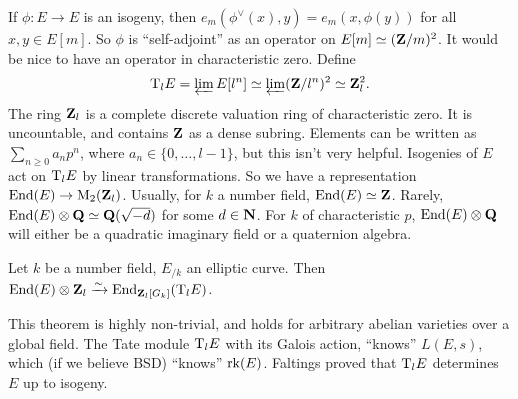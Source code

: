 If $\phi:E\to E$ is an isogeny, then $e_m(\phi^\vee(x),y) = e_m(x,\phi(y))$ for 
all $x,y\in E[m]$. So $\phi$ is ``self-adjoint'' as an operator on 
$E[m]\simeq (\mathbf{Z}/m)^2$. It would be nice to have an operator in characteristic 
zero. Define 
\[
  \mathrm{T}_l E = \varprojlim E[l^n] \simeq \varprojlim (\mathbf{Z}/l^n)^2 \simeq \mathbf{Z}_l^2 .
\]
The ring $\mathbf{Z}_l$ is a complete discrete valuation ring of characteristic zero. 
It is uncountable, and contains $\mathbf{Z}$ as a dense subring. Elements can be 
written as $\sum_{n\geqslant 0} a_n p^n$, where $a_n\in \{0,\dots,l-1\}$, but 
this isn't very helpful. Isogenies of $E$ act on $\mathrm{T}_l E$ by linear 
transformations. So we have a representation $\operatorname{End}(E)\to \operatorname{M}_2(\mathbf{Z}_l)$. 
Usually, for $k$ a number field, $\operatorname{End}(E)\simeq \mathbf{Z}$. Rarely, 
$\operatorname{End}(E)\otimes\mathbf{Q}\simeq \mathbf{Q}(\sqrt{-d})$ for some $d\in \mathbf{N}$. For $k$ of 
characteristic $p$, $\operatorname{End}(E)\otimes \mathbf{Q}$ will either be a quadratic imaginary 
field or a quaternion algebra. 

\begin{theorem}[Faltings]
Let $k$ be a number field, $E_{/k}$ an elliptic curve. Then 
$\operatorname{End}(E)\otimes \mathbf{Z}_l\xrightarrow\sim \operatorname{End}_{\mathbf{Z}_l[G_k]}(\mathrm{T}_l E)$. 
\end{theorem}

This theorem is highly non-trivial, and holds for arbitrary abelian varieties 
over a global field. The Tate module $\mathrm{T}_l E$ with its Galois action, 
``knows'' $L(E,s)$, which (if we believe BSD) ``knows'' $\operatorname{rk}(E)$. Faltings 
proved that $\mathrm{T}_l E$ determines $E$ up to isogeny. 

